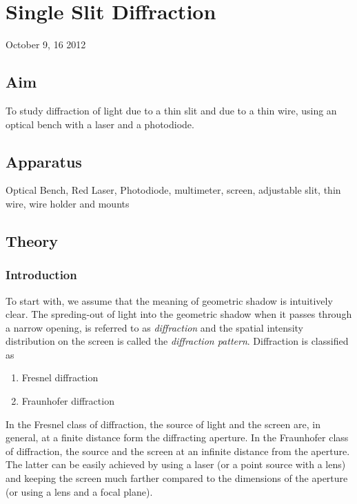 \chapter{Single Slit Diffraction}
\begin{flushright}
October 9, 16 2012
\end{flushright}
\section{Aim}
	To study diffraction of light due to a thin slit and due to a thin wire, using an optical bench with a laser and a photodiode. 
\section{Apparatus}	
	Optical Bench, Red Laser, Photodiode, multimeter, screen, adjustable slit, thin wire, wire holder and mounts

\section{Theory}
	\subsection{Introduction}
	To start with, we assume that the meaning of geometric shadow is intuitively clear. The spreding-out of light into the geometric shadow when it passes through a narrow opening, is referred to as \emph{diffraction} and the spatial intensity distribution on the screen is called the \emph{diffraction pattern}. Diffraction is classified as
	\begin{enumerate}
		\item Fresnel diffraction
		\item Fraunhofer diffraction
	\end{enumerate}

	In the Fresnel class of diffraction, the source of light and the screen are, in general, at a finite distance form the diffracting aperture. In the Fraunhofer class of diffraction, the source and the screen at an infinite distance from the aperture. The latter can be easily achieved by using a laser (or a point source with a lens) and keeping the screen much farther compared to the dimensions of the aperture (or using a lens and a focal plane).
	
